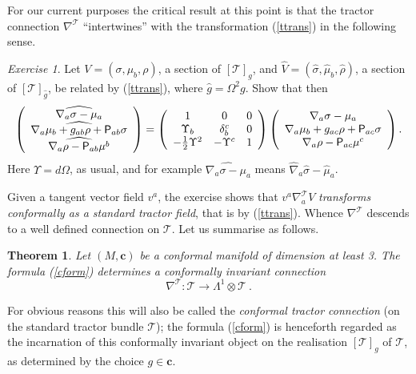 \documentclass[a4paper,12pt]{amsart}
\newcommand{\V}{\mbox{\sf P}}
\newcommand{\cc}{\boldsymbol{c}}
\newcommand{\cT}{{\mathcal T}}
\newtheorem{theorem}{Theorem}[section]
\theoremstyle{remark}
\newcommand{\nn}[1]{(\ref{#1})}
\newtheorem{exe}{Exercise}
\begin{document}
For our current purposes the critical result at this point is that the tractor
connection $\nabla^\cT$ ``intertwines'' with the transformation
\nn{ttrans} in the following sense.
\begin{exe} \label{tint}
Let $V=(\sigma, \mu_b, \rho)$, a section of $[\cT]_g$, and
$\widehat{V}=(\widehat{\sigma}, \widehat{\mu}_b, \widehat{\rho})$, a section
of $[\cT]_{\widehat{g}}$, be
related by \nn{ttrans}, where  $\widehat{g}=\Omega^2 g$.  Show that then
\begin{equation}\nonumber
\left(\begin{array}{c}
\widehat{\nabla_a\sigma-\mu_a}\\
\widehat{\nabla_a\mu_b+g_{ab}\rho+\V_{ab}\sigma}\\
\widehat{\nabla_a\rho-\V_{ab}\mu^b}
\end{array}
\right)=
\left(\begin{array}{ccc}
1 & 0 & 0\\
\Upsilon_b & \delta^c_b & 0\\
-\frac{1}{2}\Upsilon^2 & -\Upsilon^c & 1
\end{array}\right)
\left(
\begin{array}{c}
\nabla_a \sigma-\mu_a\\
\nabla_a\mu_b+g_{ac}\rho+\V_{ac}\sigma\\
\nabla_a\rho-\V_{ac}\mu^c
\end{array}
\right).
\end{equation}
Here $\Upsilon =d\Omega$, as usual, and for example
$\widehat{\nabla_a\sigma-\mu_a}$ means
$\widehat{\nabla}_a\widehat{\sigma}-\widehat{\mu}_a$.
\end{exe}
Given a tangent vector field $v^a$, the exercise shows that
$v^a\nabla_a^\cT V$ {\em transforms conformally as a standard
tractor field}, that is by \nn{ttrans}. Whence $\nabla^\cT$ descends to a
well defined connection on $\cT$. Let us summarise as follows.
\begin{theorem}\label{tthm}
Let $(M,\cc)$ be a conformal manifold of dimension at least 3. The
formula \nn{cform} determines a conformally invariant connection 
$$
\nabla^\cT: \cT\to \Lambda^1\otimes \cT~.
$$
\end{theorem}
\noindent For obvious reasons this will also be called the {\em conformal
tractor connection} (on the standard tractor bundle $\cT$); the formula
\nn{cform}  is henceforth regarded as the incarnation of this
conformally invariant object on the realisation $[\cT]_g$ of $\cT$, as 
determined by the choice $g\in \cc$.
\end{document}
